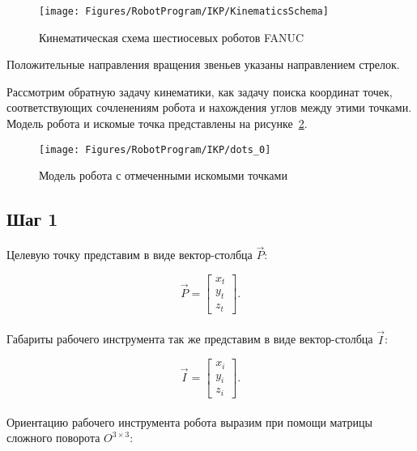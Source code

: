 \begin{figure}[H]
    \centering
    \vspace{14pt}
    \texttt{[image: Figures/RobotProgram/IKP/KinematicsSchema]}
    \caption{Кинематическая схема шестиосевых роботов FANUC}
    \label{fig:RobotProgram:IKP:KinematicsSchema}
\end{figure}

Положительные направления вращения звеньев указаны направлением стрелок.

Рассмотрим обратную задачу кинематики, как задачу поиска координат точек, соответствующих сочленениям робота и нахождения углов между этими точками.
Модель робота и искомые точка представлены на рисунке~\ref{fig:RobotProgram:IKP:dots_0}.

\begin{figure}[H]
    \centering
    \vspace{14pt}
    \texttt{[image: Figures/RobotProgram/IKP/dots\_0]}
    \caption{Модель робота с отмеченными искомыми точками}
    \label{fig:RobotProgram:IKP:dots_0}
\end{figure}

\subsection*{Шаг 1}
Целевую точку представим в виде вектор-столбца $\overrightarrow{P}$:

\begin{equation*}
    \overrightarrow{P} =
    \begin{bmatrix}
        x_t \\
        y_t \\
        z_t
    \end{bmatrix}.
\end{equation*} \\

Габариты рабочего инструмента так же представим в виде вектор-столбца $\overrightarrow{I}$:

\begin{equation*}
    \overrightarrow{I} =
    \begin{bmatrix}
        x_i \\
        y_i \\
        z_i
    \end{bmatrix}.
\end{equation*} \\

Ориентацию рабочего инструмента робота выразим при помощи матрицы сложного поворота $O^{3\times3}$:

